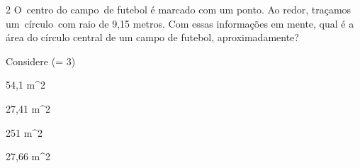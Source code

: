 





\num{2} O~centro do campo~de futebol é marcado com um ponto. Ao redor,
traçamos um~círculo~com raio de 9,15 metros. Com essas informações em
mente, qual é a área do círculo central de um campo de futebol,
aproximadamente?

Considere (\pi = 3)
\item 54,1 m^2
\item 27,41 m^2
\item 251 m^2
\item 27,66 m^2











